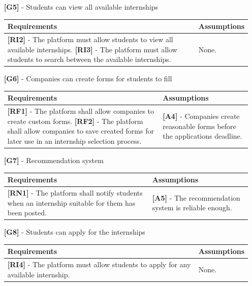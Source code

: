 \documentclass[11pt,twoside]{article}
\begin{document}
\begin{itemize}
\item[\textbf{[G5]}] - Students can view all available internships
\begin{table}[H]
\begin{tabular}{| p{} | p{} |}
\hline
\textbf{Requirements} & \textbf{Assumptions} \\
\hline
\textbf{[RI2]} - The platform must allow students to view all available internships. \newline
\textbf{[RI3]} - The platform must allow students to search between the available internships.
& None. \\
\hline
\end{tabular}
\end{table}

\item[\textbf{[G6]}] - Companies can create forms for students to fill
\begin{table}[H]
\begin{tabular}{| p{} | p{} |}
\hline
\textbf{Requirements} & \textbf{Assumptions} \\
\hline
\textbf{[RF1]} - The platform shall allow companies to create custom forms. \newline
\textbf{[RF2]} - The platform shall allow companies to save created forms for later use in an internship selection process.
& \textbf{[A4]} - Companies create reasonable forms before the applications deadline. \\
\hline
\end{tabular}
\end{table}

\item[\textbf{[G7]}] - Recommendation system
\begin{table}[H]
\begin{tabular}{| p{} | p{} |}
\hline
\textbf{Requirements} & \textbf{Assumptions} \\
\hline
\textbf{[RN1]} - The platform shall notify students when an internship suitable for them has been posted.
& \textbf{[A5]} - The recommendation system is reliable enough. \\
\hline
\end{tabular}
\end{table}

\item[\textbf{[G8]}] - Students can apply for the internships
\begin{table}[H]
\begin{tabular}{| p{} | p{} |}
\hline
\textbf{Requirements} & \textbf{Assumptions} \\
\hline
\textbf{[RI4]} - The platform must allow students to apply for any available internship.
& None. \\
\hline
\end{tabular}
\end{table}


\end{itemize}
\end{document}
